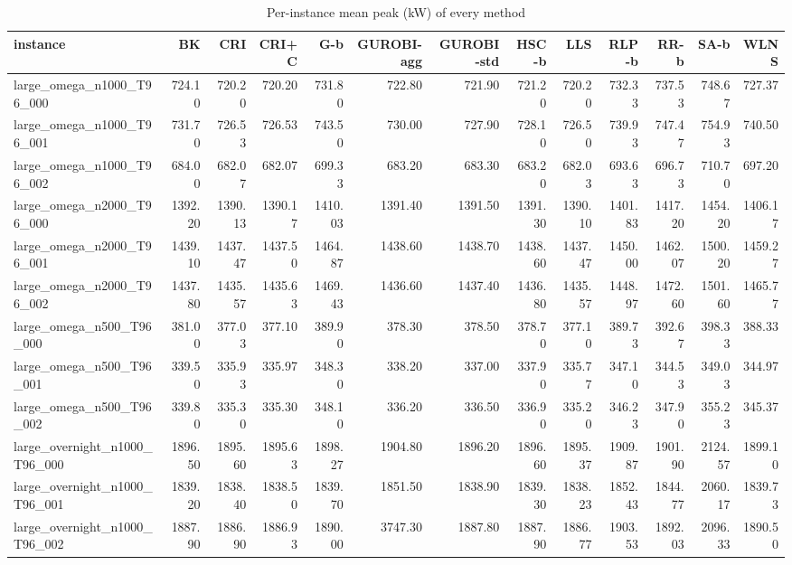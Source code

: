 \begin{table}[htbp]
\centering
\small
\caption{Per-instance mean peak (kW) of every method}
\label{tab:E4a_equal_budgets_b10_per_instance}
\begin{tabular}{lrrrrrrrrrrrr}
\toprule
instance & BK & CRI & CRI+C & G-b & GUROBI-agg & GUROBI-std & HSC-b & LLS & RLP-b & RR-b & SA-b & WLNS \\
\midrule
large\_omega\_n1000\_T96\_000 & 724.10 & 720.20 & 720.20 & 731.80 & 722.80 & 721.90 & 721.20 & 720.20 & 732.33 & 737.53 & 748.67 & 727.37 \\
large\_omega\_n1000\_T96\_001 & 731.70 & 726.53 & 726.53 & 743.50 & 730.00 & 727.90 & 728.10 & 726.50 & 739.93 & 747.47 & 754.93 & 740.50 \\
large\_omega\_n1000\_T96\_002 & 684.00 & 682.07 & 682.07 & 699.33 & 683.20 & 683.30 & 683.20 & 682.03 & 693.63 & 696.73 & 710.70 & 697.20 \\
large\_omega\_n2000\_T96\_000 & 1392.20 & 1390.13 & 1390.17 & 1410.03 & 1391.40 & 1391.50 & 1391.30 & 1390.10 & 1401.83 & 1417.20 & 1454.20 & 1406.17 \\
large\_omega\_n2000\_T96\_001 & 1439.10 & 1437.47 & 1437.50 & 1464.87 & 1438.60 & 1438.70 & 1438.60 & 1437.47 & 1450.00 & 1462.07 & 1500.20 & 1459.27 \\
large\_omega\_n2000\_T96\_002 & 1437.80 & 1435.57 & 1435.63 & 1469.43 & 1436.60 & 1437.40 & 1436.80 & 1435.57 & 1448.97 & 1472.60 & 1501.60 & 1465.77 \\
large\_omega\_n500\_T96\_000 & 381.00 & 377.03 & 377.10 & 389.90 & 378.30 & 378.50 & 378.70 & 377.10 & 389.73 & 392.67 & 398.33 & 388.33 \\
large\_omega\_n500\_T96\_001 & 339.50 & 335.93 & 335.97 & 348.30 & 338.20 & 337.00 & 337.90 & 335.77 & 347.10 & 344.53 & 349.03 & 344.97 \\
large\_omega\_n500\_T96\_002 & 339.80 & 335.30 & 335.30 & 348.10 & 336.20 & 336.50 & 336.90 & 335.20 & 346.23 & 347.90 & 355.23 & 345.37 \\
large\_overnight\_n1000\_T96\_000 & 1896.50 & 1895.60 & 1895.63 & 1898.27 & 1904.80 & 1896.20 & 1896.60 & 1895.37 & 1909.87 & 1901.90 & 2124.57 & 1899.10 \\
large\_overnight\_n1000\_T96\_001 & 1839.20 & 1838.40 & 1838.50 & 1839.70 & 1851.50 & 1838.90 & 1839.30 & 1838.23 & 1852.43 & 1844.77 & 2060.17 & 1839.73 \\
large\_overnight\_n1000\_T96\_002 & 1887.90 & 1886.90 & 1886.93 & 1890.00 & 3747.30 & 1887.80 & 1887.90 & 1886.77 & 1903.53 & 1892.03 & 2096.33 & 1890.50 \\

\end{tabular}
\end{table}

